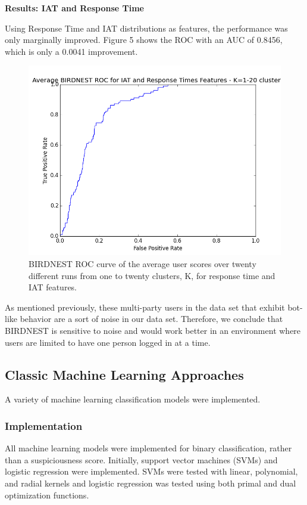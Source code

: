\documentclass{article} %
\begin{document}
\textbf{Results: IAT and Response Time}

Using Response Time and IAT distributions as features, the performance was only marginally improved.
Figure 5 shows the ROC with an AUC of 0.8456, which is only a 0.0041 improvement.

\begin{figure}[!htb]
\centering
{\caption{BIRDNEST ROC curve of the average user scores over twenty different runs from one to twenty clusters, K, for response time and IAT features.} \includegraphics[scale=0.47]{img/bird_roc.png}}
\end{figure}

As mentioned previously, these multi-party users in the data set that exhibit bot-like behavior are a sort of noise in our data set. Therefore, we conclude that BIRDNEST is sensitive to noise and would work better in an environment where users are limited to have one person logged in at a time.

\subsection{Classic Machine Learning Approaches}

A variety of machine learning classification models were implemented.

\subsubsection{Implementation}

All machine learning models were implemented for binary classification, rather than a suspiciousness score.
Initially, support vector machines (SVMs) and logistic regression were implemented.
SVMs were tested with linear, polynomial, and radial kernels and logistic regression was tested using both primal and dual optimization functions.
\end{document}
